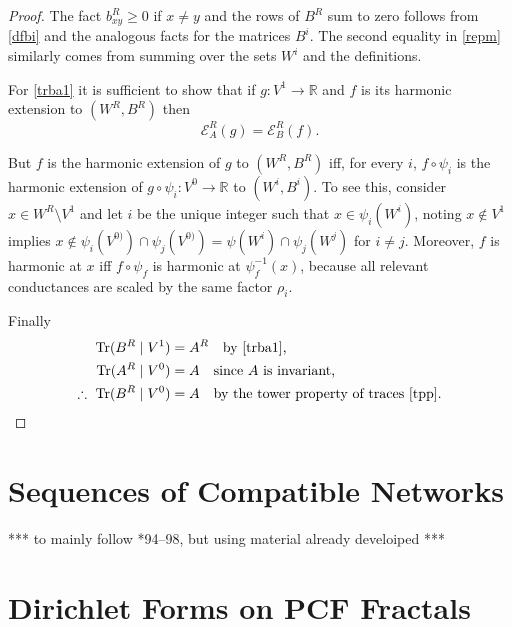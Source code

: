 \documentclass[a4paper]{amsart}
\theoremstyle{plain}
\theoremstyle{definition}
\theoremstyle{remark}
\DeclareMathOperator{\Tr}{Tr}
\begin{document}
\begin{proof} The fact $ b^R_{xy} \geq 0 $ if $ x \neq y $ and the rows of $ B^R $ sum to zero follows from \eqref{dfbi} and the analogous facts for the matrices  $ B^i $. The second equality in \eqref{repm} similarly comes from summing over the sets $ W^i$ and the definitions.

\medskip For \eqref{trba1} it is sufficient to show that if $ g : V^{1} \to \mathbb{R} $ and $ f $ is its harmonic extension to $ (W^R,B^R) $ then
\[
\mathcal{E}_A^R(g) = \mathcal{E} _B^R(f). 
\]

But $ f $ is the harmonic extension of $ g $ to $ (W^R,B^R) $  iff,  for every $ i $,  $ f\circ \psi_i $ is the harmonic extension  of $ g\circ \psi_i : V^{0} \to \mathbb{R} $ to $ (W^i,B^i) $.
To see this, consider $ x \in W^R\setminus V^{1} $ and let $ i $ be the unique integer such that $ x \in \psi_i(W^i) $, noting $ x \notin V^{1} $ implies $ x \notin \psi_i(V^{0)})\cap \psi_j(V^{0)})= \psi(W^i) \cap \psi_j(W^j) $ for $ i\neq j $.  Moreover,  $ f $ is harmonic at $ x $ iff $ f \circ \psi_f $  is harmonic at $ \psi_f^{-1}(x) $, because all relevant conductances are scaled by the same factor $ \rho_i $.

\medskip Finally
\begin{align*}
\Tr(B^R \mid V^{1}) &= A^R \quad \text{by \eqref{trba1},} \\
\Tr(A^R \mid V^{0}) &= A  \quad \text{since $ A $ is invariant,} \\
\therefore\ \Tr(B^R \mid V^{0}) &= A \quad \text{by the tower property of traces \eqref{tpp}.} \qedhere \\
\end{align*}
 \end{proof} 
 
 
\section{\textbf{Sequences of Compatible Networks}} 
 
*** to mainly follow \cite{Bar1}*{94--98}, but using material already develoiped ***


\section{\textbf{Dirichlet Forms on PCF Fractals}} 
\end{document}
